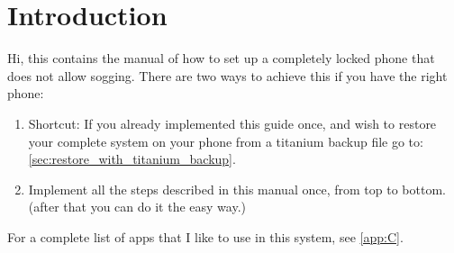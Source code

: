 \section{Introduction}\label{sec:introduction}
Hi, this contains the manual of how to set up a completely locked phone that does not allow sogging. There are two ways to achieve this if you have the right phone:
\begin{enumerate}
    \item Shortcut: If you already implemented this guide once, and wish to restore your complete system on your phone from a titanium backup file go to: \cref{sec:restore_with_titanium_backup}. 
    \item Implement all the steps described in this manual once, from top to bottom. (after that you can do it the easy way.)
\end{enumerate}
For a complete list of apps that I like to use in this system, see \cref{app:C}.

